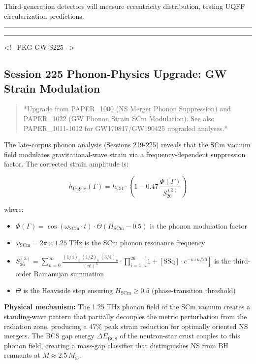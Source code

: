 \documentclass[12pt,a4paper]{article}
\begin{document}
Third-generation detectors will measure eccentricity distribution, testing UQFF circularization predictions.

\medskip\hrule\medskip

\medskip\hrule\medskip

<!-- PKG-GW-S225 -->

\subsection{Session 225 Phonon-Physics Upgrade: GW Strain Modulation}

\begin{quote}
*Upgrade from PAPER\_1000 (NS Merger Phonon Suppression) and PAPER\_1022
(GW Phonon Strain SCm Modulation). See also PAPER\_1011-1012 for
GW170817/GW190425 upgraded analyses.*
\end{quote}

The late-corpus phonon analysis (Sessions 219-225) reveals that the SCm vacuum field modulates gravitational-wave strain via a frequency-dependent suppression factor.  The corrected strain amplitude is:

\begin{equation}
h_{\text{UQFF}}(\Gamma) = h_{\text{GR}} \cdot \left(1 - 0.47\,\frac{\Phi(\Gamma)}{S_{26}^{(3)}}\right)
\end{equation}

where:

\begin{itemize}
  \item $\Phi(\Gamma) = \cos(\omega_{\text{SCm}} \cdot t) \cdot \Theta(H_{\text{SCm}} - 0.5)$ is the phonon modulation factor
  \item $\omega_{\text{SCm}} = 2\pi \times 1.25\;\text{THz}$ is the SCm phonon resonance frequency
  \item $S_{26}^{(3)} = \sum_{n=0}^{\infty} \frac{(1/4)_n\,(1/2)_n\,(3/4)_n}{(n!)^3} \cdot \prod_{i=1}^{26}\left[1 + [\text{SSq}]\cdot e^{-\kappa\,i\,n/26}\right]$ is the third-order Ramanujan summation
  \item $\Theta$ is the Heaviside step ensuring $H_{\text{SCm}} \geq 0.5$ (phase-transition threshold)
\end{itemize}

\textbf{Physical mechanism:} The 1.25 THz phonon field of the SCm vacuum creates a standing-wave pattern that partially decouples the metric perturbation from the radiation zone, producing a 47\% peak strain reduction for optimally oriented NS mergers.  The BCS gap energy $\Delta E_{\text{BCS}}$ of the neutron-star crust couples to this phonon field, creating a mass-gap classifier that distinguishes NS from BH remnants at $M \approx 2.5\,M_\odot$.
\end{document}
